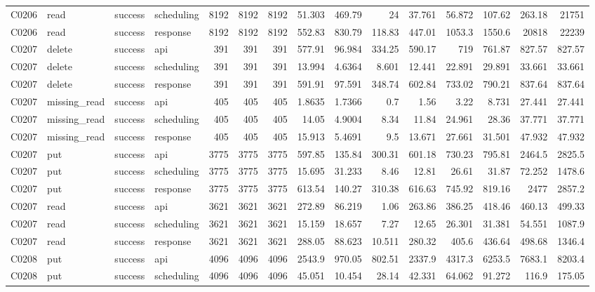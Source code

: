 \begin{landscape}
\begin{longtable}{llllrrrrrrrrrrr}
C0206 & read & success & scheduling & 8192 & 8192 & 8192 & 51.303 & 469.79 & 24 & 37.761 & 56.872 & 107.62 & 263.18 & 21751\\
C0206 & read & success & response & 8192 & 8192 & 8192 & 552.83 & 830.79 & 118.83 & 447.01 & 1053.3 & 1550.6 & 20818 & 22239\\
C0207 & delete & success & api & 391 & 391 & 391 & 577.91 & 96.984 & 334.25 & 590.17 & 719 & 761.87 & 827.57 & 827.57\\
C0207 & delete & success & scheduling & 391 & 391 & 391 & 13.994 & 4.6364 & 8.601 & 12.441 & 22.891 & 29.891 & 33.661 & 33.661\\
C0207 & delete & success & response & 391 & 391 & 391 & 591.91 & 97.591 & 348.74 & 602.84 & 733.02 & 790.21 & 837.64 & 837.64\\
C0207 & missing\_\allowbreak{}read & success & api & 405 & 405 & 405 & 1.8635 & 1.7366 & 0.7 & 1.56 & 3.22 & 8.731 & 27.441 & 27.441\\
C0207 & missing\_\allowbreak{}read & success & scheduling & 405 & 405 & 405 & 14.05 & 4.9004 & 8.34 & 11.84 & 24.961 & 28.36 & 37.771 & 37.771\\
C0207 & missing\_\allowbreak{}read & success & response & 405 & 405 & 405 & 15.913 & 5.4691 & 9.5 & 13.671 & 27.661 & 31.501 & 47.932 & 47.932\\
C0207 & put & success & api & 3775 & 3775 & 3775 & 597.85 & 135.84 & 300.31 & 601.18 & 730.23 & 795.81 & 2464.5 & 2825.5\\
C0207 & put & success & scheduling & 3775 & 3775 & 3775 & 15.695 & 31.233 & 8.46 & 12.81 & 26.61 & 31.87 & 72.252 & 1478.6\\
C0207 & put & success & response & 3775 & 3775 & 3775 & 613.54 & 140.27 & 310.38 & 616.63 & 745.92 & 819.16 & 2477 & 2857.2\\
C0207 & read & success & api & 3621 & 3621 & 3621 & 272.89 & 86.219 & 1.06 & 263.86 & 386.25 & 418.46 & 460.13 & 499.33\\
C0207 & read & success & scheduling & 3621 & 3621 & 3621 & 15.159 & 18.657 & 7.27 & 12.65 & 26.301 & 31.381 & 54.551 & 1087.9\\
C0207 & read & success & response & 3621 & 3621 & 3621 & 288.05 & 88.623 & 10.511 & 280.32 & 405.6 & 436.64 & 498.68 & 1346.4\\
C0208 & put & success & api & 4096 & 4096 & 4096 & 2543.9 & 970.05 & 802.51 & 2337.9 & 4317.3 & 6253.5 & 7683.1 & 8203.4\\
C0208 & put & success & scheduling & 4096 & 4096 & 4096 & 45.051 & 10.454 & 28.14 & 42.331 & 64.062 & 91.272 & 116.9 & 175.05\\

\end{longtable}
\end{landscape}
